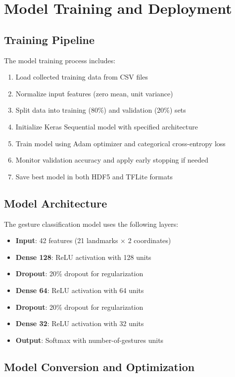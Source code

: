 \section{Model Training and Deployment}

\subsection{Training Pipeline}

The model training process includes:
\begin{enumerate}
    \item Load collected training data from CSV files
    \item Normalize input features (zero mean, unit variance)
    \item Split data into training (80\%) and validation (20\%) sets
    \item Initialize Keras Sequential model with specified architecture
    \item Train model using Adam optimizer and categorical cross-entropy loss
    \item Monitor validation accuracy and apply early stopping if needed
    \item Save best model in both HDF5 and TFLite formats
\end{enumerate}

\subsection{Model Architecture}

The gesture classification model uses the following layers:
\begin{itemize}
    \item \textbf{Input}: 42 features (21 landmarks × 2 coordinates)
    \item \textbf{Dense 128}: ReLU activation with 128 units
    \item \textbf{Dropout}: 20\% dropout for regularization
    \item \textbf{Dense 64}: ReLU activation with 64 units
    \item \textbf{Dropout}: 20\% dropout for regularization
    \item \textbf{Dense 32}: ReLU activation with 32 units
    \item \textbf{Output}: Softmax with number-of-gestures units
\end{itemize}

\subsection{Model Conversion and Optimization}

